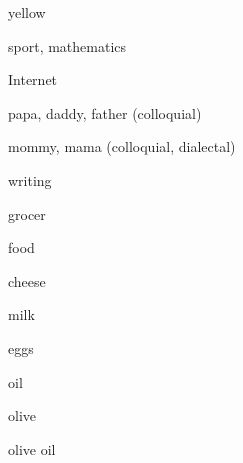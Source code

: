 \begin{flashcard}{\LARGE yellow}
\LARGE {}
\end{flashcard}
\begin{flashcard}{\LARGE sport, mathematics}
\LARGE {}
\end{flashcard}
\begin{flashcard}{\LARGE Internet}
\LARGE {}
\end{flashcard}
\begin{flashcard}{\LARGE papa, daddy, father (colloquial)}
\LARGE {}
\end{flashcard}
\begin{flashcard}{\LARGE mommy, mama (colloquial, dialectal)}
\LARGE {}
\end{flashcard}
\begin{flashcard}{\LARGE writing}
\LARGE {}
\end{flashcard}
\begin{flashcard}{\LARGE grocer}
\LARGE {}
\end{flashcard}
\begin{flashcard}{\LARGE food}
\LARGE {}
\end{flashcard}
\begin{flashcard}{\LARGE cheese}
\LARGE {}
\end{flashcard}
\begin{flashcard}{\LARGE milk}
\LARGE {}
\end{flashcard}
\begin{flashcard}{\LARGE eggs}
\LARGE {}
\end{flashcard}
\begin{flashcard}{\LARGE oil}
\LARGE {}
\end{flashcard}
\begin{flashcard}{\LARGE olive}
\LARGE {}
\end{flashcard}
\begin{flashcard}{\LARGE olive oil}
\LARGE {}
\end{flashcard}
